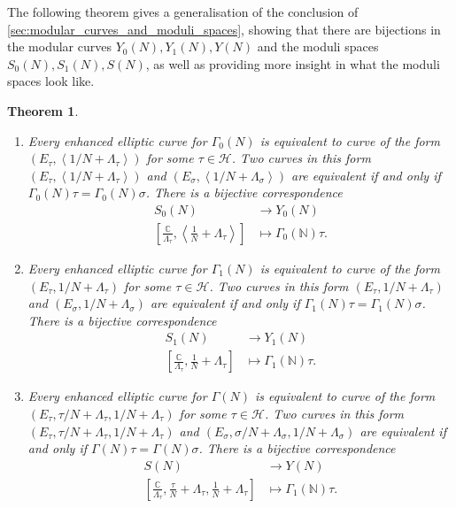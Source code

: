 \documentclass[a4paper]{article}
\theoremstyle{theoremdd}
\newtheorem{theorem}{Theorem}[section]
\theoremstyle{definitiondd}
\theoremstyle{remarkdd}
\newcommand{\N}{\mathbb{N}}
\newcommand{\C}{\mathbb{C}}
\begin{document}
The following theorem gives a generalisation of the conclusion of \cref{sec:modular_curves_and_moduli_spaces}, showing that there are bijections in the modular curves $Y_0(N), Y_1(N), Y(N)$ and the moduli spaces $S_0(N), S_1(N), S(N)$, as well as providing more insight in what the moduli spaces look like. 
\begin{theorem}
	\hspace{\linewidth}
	\begin{enumerate}
		\item Every enhanced elliptic curve for $\Gamma_0(N)$ is equivalent to curve of the form $(E_\tau, \left<1 / N + \Lambda_\tau \right>)$ for some $\tau \in \mathcal{H} $. 
			Two curves in this form $(E_\tau, \left<1 / N + \Lambda_\tau \right>)$ and $(E_\sigma, \left<1 / N + \Lambda_\sigma \right>)$ are equivalent if and only if $\Gamma_0\left( N \right) \tau = \Gamma_0(N) \sigma$. There is a bijective correspondence
			\begin{align*}
				S_0(N) &\longrightarrow Y_0(N) \\
				\left[\frac{\C}{\Lambda_\tau}, \left<\frac{1}{N} + \Lambda_\tau \right>\right] &\longmapsto \Gamma_0(\N)\tau
			.\end{align*}
	
		\item Every enhanced elliptic curve for $\Gamma_1(N)$ is equivalent to curve of the form $(E_\tau, 1 / N + \Lambda_\tau )$ for some $\tau \in \mathcal{H} $. 
			Two curves in this form $(E_\tau, 1 / N + \Lambda_\tau )$ and $(E_\sigma, 1 / N + \Lambda_\sigma)$ are equivalent if and only if $\Gamma_1\left( N \right) \tau = \Gamma_1(N) \sigma$. There is a bijective correspondence
			\begin{align*}
				S_1(N) &\longrightarrow Y_1(N) \\
				\left[\frac{\C}{\Lambda_\tau}, \frac{1}{N} + \Lambda_\tau \right] &\longmapsto \Gamma_1(\N)\tau
			.\end{align*}
		\item Every enhanced elliptic curve for $\Gamma(N)$ is equivalent to curve of the form $(E_\tau, \tau / N + \Lambda_\tau, 1 / N + \Lambda_\tau )$ for some $\tau \in \mathcal{H} $. 
			Two curves in this form $(E_\tau, \tau / N + \Lambda_\tau,  1 / N + \Lambda_\tau )$ and $(E_\sigma, \sigma / N + \Lambda_\sigma,1 / N + \Lambda_\sigma)$ are equivalent if and only if $\Gamma\left( N \right) \tau = \Gamma(N) \sigma$. There is a bijective correspondence
			\begin{align*}
				S(N) &\longrightarrow Y(N) \\
				\left[\frac{\C}{\Lambda_\tau}, \frac{\tau}{N} + \Lambda_\tau, \frac{1}{N} + \Lambda_\tau \right] &\longmapsto \Gamma_1(\N)\tau
			.\end{align*}
	\end{enumerate}
\end{theorem}
\end{document}
